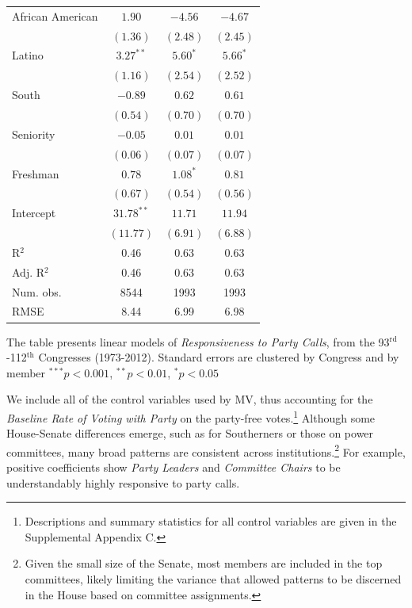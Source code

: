 \documentclass[12pt]{article}
\begin{document}
\begin{table}[!htbp]
\begin{threeparttable}
\begin{tabular}{l c c c }
African American      & $1.90$       & $-4.56$      & $-4.67$       \\
                      & $(1.36)$     & $(2.48)$     & $(2.45)$      \\
Latino                & $3.27^{**}$  & $5.60^{*}$   & $5.66^{*}$    \\
                      & $(1.16)$     & $(2.54)$     & $(2.52)$      \\
South                 & $-0.89$      & $0.62$       & $0.61$        \\
                      & $(0.54)$     & $(0.70)$     & $(0.70)$      \\
Seniority             & $-0.05$      & $0.01$       & $0.01$        \\
                      & $(0.06)$     & $(0.07)$     & $(0.07)$      \\
Freshman              & $0.78$       & $1.08^{*}$   & $0.81$        \\
                      & $(0.67)$     & $(0.54)$     & $(0.56)$      \\
Intercept             & $31.78^{**}$ & $11.71$      & $11.94$       \\
                      & $(11.77)$    & $(6.91)$     & $(6.88)$      \\
\hline
R$^2$                 & 0.46         & 0.63         & 0.63          \\
Adj. R$^2$            & 0.46         & 0.63         & 0.63          \\
Num. obs.             & 8544         & 1993         & 1993          \\
RMSE                  & 8.44         & 6.99         & 6.98          \\
\hline

\end{tabular}
\begin{tablenotes}
   \item
   The table presents linear models of \textit{Responsiveness to Party Calls},
   from the 93$^{\text{rd}}$-112$^{\text{th}}$ Congresses (1973-2012).
  Standard errors are clustered by Congress and by member
   $^{***}p<0.001$, $^{**}p<0.01$, $^*p<0.05$
 \end{tablenotes}
\end{threeparttable}
\end{table}

We include all of the control variables used by MV, thus accounting for the \textit{Baseline Rate of Voting with Party} on the party-free votes.\footnote{\doublespacing\normalsize Descriptions and summary statistics for all control variables are given in the Supplemental Appendix C.} Although some House-Senate differences emerge, such as for Southerners or those on power committees, many broad patterns are consistent across institutions.\footnote{\doublespacing\normalsize Given the small size of the Senate, most members are included in the top committees, likely limiting the variance that allowed patterns to be discerned in the House based on committee assignments.} For example, positive coefficients show \textit{Party Leaders} and \textit{Committee Chairs} to be understandably highly responsive to party calls.
\end{document}
